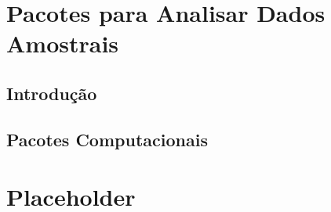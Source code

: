 \documentclass[]{book}
\theoremstyle{definition}
\theoremstyle{definition}
\theoremstyle{definition}
\theoremstyle{remark}
\begin{document}
\chapter{Pacotes para Analisar Dados Amostrais}\label{pacotes}

\section{Introdução}\label{introducao-8}

\section{Pacotes Computacionais}\label{pacotes-computacionais}

\chapter{Placeholder}\label{placeholder}


\end{document}
